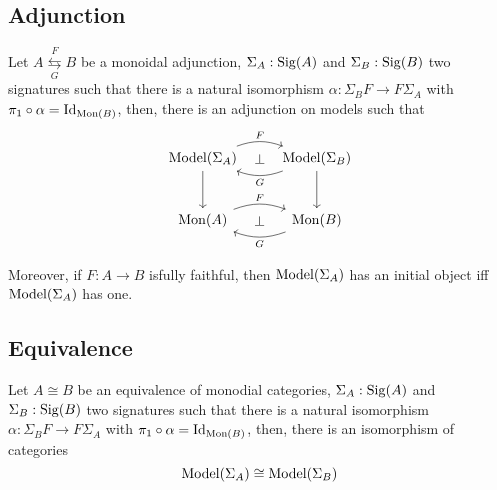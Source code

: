 \subsection{Adjunction}
\begin{theorem}
  Let $A \overset{F}{\underset{G}{\leftrightarrows}} B$ be a monoidal adjunction,
  $\Sigma_A : \operatorname{Sig}(A)$ and $\Sigma_B : \operatorname{Sig}(B)$ two signatures such that
  there is a natural isomorphism $\alpha : \Sigma_B F \to F \Sigma_A$ with
  $\pi_1 \circ \alpha = \operatorname{Id}_{\operatorname{Mon}(B)}$, then, there is an adjunction on
  models such that
  \[
  \begin{tikzcd}[row sep=large]
    \Model(\Sigma_A) \ar[r, bend left=20, "F" {name=FT}] \ar[d]
      & \Model(\Sigma_B) \ar[l, bend left=20, "G" {name=GT}] \ar[d]
        \ar[from=FT, to=GT, phantom, "\bot"] \\
    \Mon(A) \ar[r, bend left=20, "F" {name=FB}]
      & \Mon(B) \ar[l, bend left=20, "G" {name=GB}]
      \ar[from=FB, to=GB, phantom, "\bot"]
  \end{tikzcd}
  \]
\end{theorem}

\begin{theorem}
  Moreover, if $F : A \to B$ isfully faithful, then $\operatorname{Model}(\Sigma_A)$
  has an initial object iff $\operatorname{Model}(\Sigma_A)$ has one.
\end{theorem}

\subsection{Equivalence}
\begin{theorem}
  Let $A \cong B$ be an equivalence of monodial categories,
  $\Sigma_A : \operatorname{Sig}(A)$ and $\Sigma_B : \operatorname{Sig}(B)$ two signatures such that
  there is a natural isomorphism $\alpha : \Sigma_B F \to F \Sigma_A$ with
  $\pi_1 \circ \alpha = \operatorname{Id}_{\operatorname{Mon}(B)}$, then, there is an isomorphism of categories
  \[ \operatorname{Model}(\Sigma_A) \cong \operatorname{Model}(\Sigma_B) \]
\end{theorem}